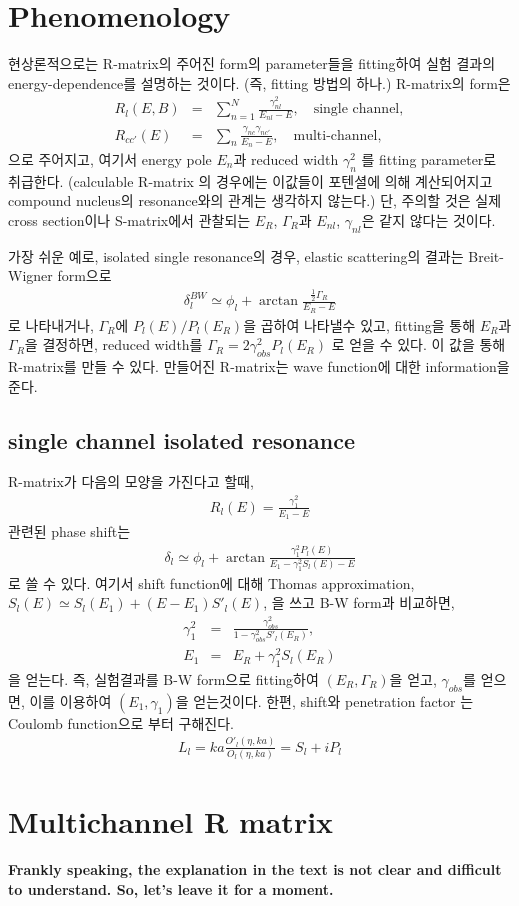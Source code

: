 \documentclass[11pt]{book}
\newcommand{\bea}{\begin{eqnarray}}
\newcommand{\eea}{\end{eqnarray}}
\newcommand{\no}{\nonumber \\}
\begin{document}
\section{Phenomenology} 
현상론적으로는 R-matrix의 주어진 form의 parameter들을 fitting하여 실험 결과의 energy-dependence를
설명하는 것이다. (즉, fitting 방법의 하나.)
R-matrix의 form은 
\bea 
R_l(E,B)&=&\sum_{n=1}^N \frac{\gamma_{nl}^2}{E_{nl}-E},\quad \mbox{single channel},\no 
R_{cc'}(E)&=&\sum_{n} \frac{\gamma_{nc}\gamma_{nc'}}{E_n-E},
\quad \mbox{multi-channel},
\eea  
으로 주어지고, 여기서 energy pole $E_{n}$과 reduced width $\gamma_{n}^2$ 를 fitting parameter로 취급한다. (calculable R-matrix 의 경우에는 이값들이 포텐셜에 의해
계산되어지고 compound nucleus의 resonance와의 관계는 생각하지 않는다.)
단, 주의할 것은 실제 cross section이나 S-matrix에서 관찰되는 $E_R$, $\Gamma_R$과 
$E_{nl}$, $\gamma_{nl}$은 같지 않다는 것이다. 

가장 쉬운 예로, isolated single resonance의 경우, elastic scattering의 결과는 
Breit-Wigner form으로
\bea 
\delta^{BW}_l\simeq \phi_l+\arctan\frac{\frac{1}{2}\Gamma_R}{E_R-E}
\eea 
로 나타내거나, $\Gamma_R$에 $P_l(E)/P_l(E_R)$을 곱하여 나타낼수 있고, 
fitting을 통해 $E_R$과 $\Gamma_R$을 결정하면, reduced width를 
$\Gamma_R=2\gamma^2_{obs} P_l(E_R)$ 로 얻을 수 있다. 이 값을 통해 R-matrix를 만들 수 있다. 
만들어진 R-matrix는 wave function에 대한 information을 준다. 


\subsection{single channel isolated resonance}
R-matrix가 다음의 모양을 가진다고 할때,
\bea
R_l(E)=\frac{\gamma_1^2}{E_1-E} 
\eea
관련된 phase shift는
\bea 
\delta_l\simeq \phi_l+\arctan \frac{\gamma_1^2 P_l(E)}{E_1-\gamma_1^2 S_l(E)-E}
\eea 
로 쓸 수 있다. 여기서 shift function에 대해 Thomas approximation, 
$S_l(E)\simeq S_l(E_1)+(E-E_1)S'_l(E)$, 을 쓰고 B-W form과 비교하면,
\bea 
\gamma_1^2&=&\frac{\gamma_{obs}^2}{1-\gamma_{obs}^2 S'_l(E_R)},\no 
E_1 &=& E_R+\gamma_1^2 S_l(E_R)
\eea 
을 얻는다. 즉, 실험결과를 B-W form으로 fitting하여 $(E_R, \Gamma_R)$을 얻고, $\gamma_{obs}$를
얻으면, 이를 이용하여 $(E_1,\gamma_1)$을 얻는것이다. 한편, shift와 penetration factor 는 
Coulomb function으로 부터 구해진다. 
\bea 
L_l=ka \frac{O'_l(\eta,ka)}{O_l(\eta,ka)}= S_l +i P_l
\eea 


\section{Multichannel R matrix}
{\bf Frankly speaking, the explanation in the text is not clear and difficult to
understand. So, let's leave it for a moment.}
\end{document}
